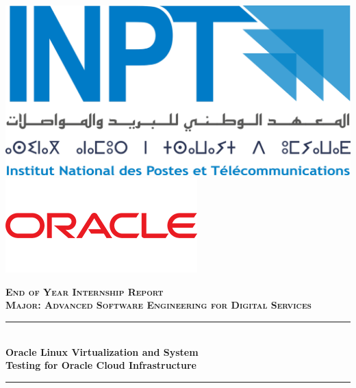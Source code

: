 \begin{titlepage}
  \thispagestyle{empty}
  
  \vspace{1cm}

  \includegraphics[scale=0.1]{Images/Logo_inpt.png} 
  \hfill 
  \includegraphics[scale=0.45]{Images/logo_oracle.png}

  \vspace{1.5cm}
  \begin{center}
  {\large \textsc{\textbf{End of Year Internship Report}}}\\[0.1cm]
  {\large \textsc{\textbf{Major: \textbf{Advanced Software Engineering for Digital Services}}}} \\[0.1cm]
  \vspace{1cm}

  \vspace{0.8cm}

  \rule{\linewidth}{0.3mm} \\[0.6cm]   %
  {\huge \textbf{Oracle Linux Virtualization and System} \\[0.3cm] \vspace{0.3cm} \textbf{Testing for Oracle Cloud Infrastructure}} \\[0.5cm]
  \rule{\linewidth}{0.4mm} \\[0.4cm]
  \vspace{1.5cm}

  \vspace{0.5cm}


\end{center}
\end{titlepage}
